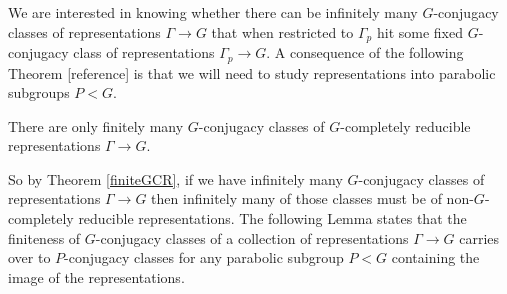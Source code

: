 We are interested in knowing whether there can be infinitely many $G$-conjugacy classes of representations $\Gamma\rightarrow G$ that when restricted to $\Gamma_p$ hit some fixed $G$-conjugacy class of representations $\Gamma_p\rightarrow G$. A consequence of the following Theorem [reference] is that we will need to study representations into parabolic subgroups $P < G$.

\begin{theorem} \label{finiteGCR} There are only finitely many $G$-conjugacy classes of $G$-completely reducible representations $\Gamma\rightarrow G$.
\end{theorem}

So by Theorem \ref{finiteGCR}, if we have infinitely many $G$-conjugacy classes of representations $\Gamma\rightarrow G$ then infinitely many of those classes must be of non-$G$-completely reducible representations. The following Lemma states that the finiteness of $G$-conjugacy classes of a collection of representations $\Gamma\rightarrow G$ carries over to $P$-conjugacy classes for any parabolic subgroup $P<G$ containing the image of the representations.

